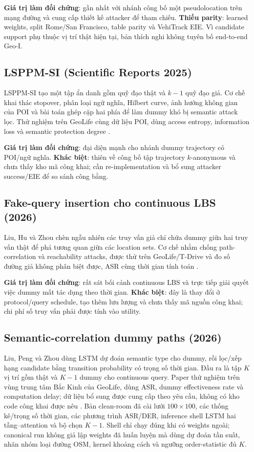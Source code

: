 \documentclass[12pt,a4paper,oneside]{report}
\begin{document}
\textbf{Giá trị làm đối chứng}: gần nhất với nhánh công bố một pseudolocation trên mạng đường và cung cấp thiết kế attacker để tham chiếu. \textbf{Thiếu parity}: learned weights, split Rome/San Francisco, table parity và VehiTrack EIE. Vì candidate support phụ thuộc vị trí thật hiện tại, bản thích nghi không tuyên bố end-to-end Geo-I.

\subsection{LSPPM-SI (Scientific Reports 2025)}

LSPPM-SI tạo một tập ẩn danh gồm quỹ đạo thật và $k-1$ quỹ đạo giả. Cơ chế khai thác stopover, phân loại ngữ nghĩa, Hilbert curve, ảnh hưởng không gian của POI và bài toán ghép cặp hai phía để làm dummy khó bị semantic attack lọc. Thử nghiệm trên GeoLife cùng dữ liệu POI, dùng access entropy, information loss và semantic protection degree \citep{kuang2025lsppm}.

\textbf{Giá trị làm đối chứng}: đại diện mạnh cho nhánh dummy trajectory có POI/ngữ nghĩa. \textbf{Khác biệt}: thiên về công bố tập trajectory $k$-anonymous và chưa thấy kho mã công khai; cần re-implementation và bổ sung attacker success/EIE để so sánh công bằng.

\subsection{Fake-query insertion cho continuous LBS (2026)}

Liu, Hu và Zhou chèn ngẫu nhiên các truy vấn giả chỉ chứa dummy giữa hai truy vấn thật để phá tương quan giữa các location sets. Cơ chế nhằm chống path-correlation và reachability attacks, được thử trên GeoLife/T-Drive và đo số đường giả không phân biệt được, ASR cùng thời gian tính toán \citep{liu2026fakequeries}.

\textbf{Giá trị làm đối chứng}: rất sát bối cảnh continuous LBS và trực tiếp giải quyết việc dummy mất tác dụng theo thời gian. \textbf{Khác biệt}: đây là thay đổi ở protocol/query schedule, tạo thêm lưu lượng và chưa thấy mã nguồn công khai; chi phí số truy vấn phải được tính vào utility.

\subsection{Semantic-correlation dummy paths (2026)}

Liu, Peng và Zhou dùng LSTM dự đoán semantic type cho dummy, rồi lọc/xếp hạng candidate bằng transition probability có trọng số thời gian. Đầu ra là tập $K$ vị trí gồm thật và $K-1$ dummy cho continuous query. Paper thử nghiệm trên vùng trung tâm Bắc Kinh của GeoLife, dùng ASR, dummy effectiveness rate và computation delay; dữ liệu bổ sung được cung cấp theo yêu cầu, không có kho code công khai được nêu \citep{liu2026semantic}. Bản clean-room đã cài lưới $100\times100$, các thống kê/trọng số thời gian, các phương trình ASR/DER, inference shell LSTM hai tầng--attention và bộ chọn $K-1$. Shell chỉ chạy đúng khi có weights ngoài; canonical run không giả lập weights đã huấn luyện mà dùng dự đoán tần suất, nhãn nhóm loại đường OSM, kernel khoảng cách và ngưỡng order-statistic đủ $K$.
\end{document}
